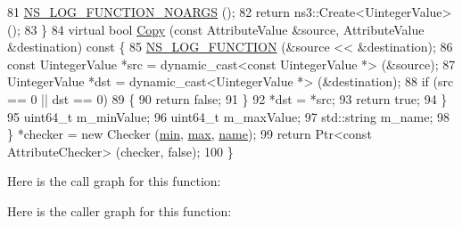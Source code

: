 \begin{DoxyCode}
81       \hyperlink{log-macros-disabled_8h_a8f7e4afc291c9d29a65c18ac1f79197b}{NS\_LOG\_FUNCTION\_NOARGS} ();
82       \textcolor{keywordflow}{return} ns3::Create<UintegerValue> ();
83     \}
84     \textcolor{keyword}{virtual} \textcolor{keywordtype}{bool} \hyperlink{namespacens3_a952d99f6d759fee74dda19f308451bc1}{Copy} (\textcolor{keyword}{const} AttributeValue &source, AttributeValue &destination)\textcolor{keyword}{ const }\{
85       \hyperlink{log-macros-disabled_8h_a90b90d5bad1f39cb1b64923ea94c0761}{NS\_LOG\_FUNCTION} (&source << &destination);
86       \textcolor{keyword}{const} UintegerValue *src = \textcolor{keyword}{dynamic\_cast<}\textcolor{keyword}{const }UintegerValue *\textcolor{keyword}{>} (&source);
87       UintegerValue *dst = \textcolor{keyword}{dynamic\_cast<}UintegerValue *\textcolor{keyword}{>} (&destination);
88       \textcolor{keywordflow}{if} (src == 0 || dst == 0)
89         \{
90           \textcolor{keywordflow}{return} \textcolor{keyword}{false};
91         \}
92       *dst = *src;
93       \textcolor{keywordflow}{return} \textcolor{keyword}{true};
94     \}
95     uint64\_t m\_minValue;
96     uint64\_t m\_maxValue;
97     std::string m\_name;
98   \} *checker = \textcolor{keyword}{new} Checker (\hyperlink{80211b_8c_ac6afabdc09a49a433ee19d8a9486056d}{min}, \hyperlink{80211b_8c_affe776513b24d84b39af8ab0930fef7f}{max}, \hyperlink{generate__test__data__lte__spectrum__model_8m_ab74e6bf80237ddc4109968cedc58c151}{name});
99   \textcolor{keywordflow}{return} Ptr<const AttributeChecker> (checker, \textcolor{keyword}{false});
100 \}
\end{DoxyCode}


Here is the call graph for this function\+:




Here is the caller graph for this function\+:


